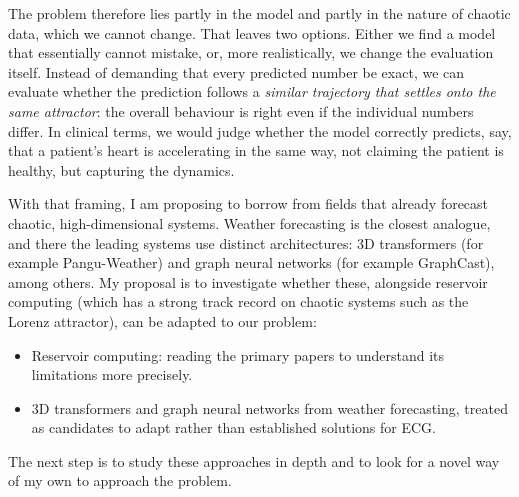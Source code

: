 \documentclass[11pt,a4paper]{article}
\begin{document}
The problem therefore lies partly in the model and partly in the nature of chaotic data, which
we cannot change. That leaves two options. Either we find a model that essentially cannot
mistake, or, more realistically, we change the evaluation itself. Instead of demanding that
every predicted number be exact, we can evaluate whether the prediction follows a
\emph{similar trajectory that settles onto the same attractor}: the overall behaviour is right
even if the individual numbers differ. In clinical terms, we would judge whether the model
correctly predicts, say, that a patient's heart is accelerating in the same way, not claiming
the patient is healthy, but capturing the dynamics.

With that framing, I am proposing to borrow from fields that already forecast chaotic,
high-dimensional systems. Weather forecasting is the closest analogue, and there the leading
systems use distinct architectures: 3D transformers (for example Pangu-Weather) and graph
neural networks (for example GraphCast), among others. My proposal is to investigate whether
these, alongside reservoir computing (which has a strong track record on chaotic systems such
as the Lorenz attractor), can be adapted to our problem:
\begin{itemize}
  \item Reservoir computing: reading the primary papers to understand its limitations more
        precisely.
  \item 3D transformers and graph neural networks from weather forecasting, treated as
        candidates to adapt rather than established solutions for ECG.
\end{itemize}
The next step is to study these approaches in depth and to look for a novel way of my own to
approach the problem.

\end{document}
